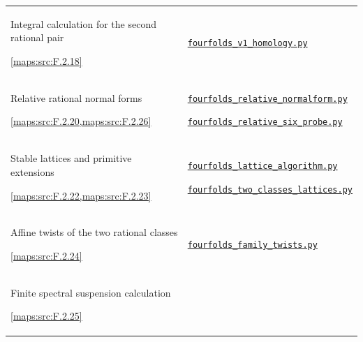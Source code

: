 \begin{longtable}{@{}p{}p{}@{}}
\hypertarget{prog:V:second-pair}{}Integral calculation for the second rational pair\par \cref{maps:src:F.2.18} &
\href{https://github.com/KokunoYumeto/s6-complex-structure-workbench/blob/\SsixRepositoryCommit/pro_returns/S6_10_PAPERS_checkpoint_15_20261119T1045Z/S6_10_PAPERS/code/V/replay_chains/code/fourfolds_v1_homology.py}{\nolinkurl{fourfolds_v1_homology.py}} \\[3pt]
\hypertarget{prog:V:normal-forms}{}Relative rational normal forms\par \cref{maps:src:F.2.20,maps:src:F.2.26} &
\href{https://github.com/KokunoYumeto/s6-complex-structure-workbench/blob/\SsixRepositoryCommit/pro_returns/S6_10_PAPERS_checkpoint_15_20261119T1045Z/S6_10_PAPERS/code/V/replay_chains/code/fourfolds_relative_normalform.py}{\nolinkurl{fourfolds_relative_normalform.py}}\par \href{https://github.com/KokunoYumeto/s6-complex-structure-workbench/blob/\SsixRepositoryCommit/pro_returns/S6_10_PAPERS_checkpoint_15_20261119T1045Z/S6_10_PAPERS/code/V/replay_chains/code/fourfolds_relative_six_probe.py}{\nolinkurl{fourfolds_relative_six_probe.py}} \\[3pt]
\hypertarget{prog:V:lattices}{}Stable lattices and primitive extensions\par \cref{maps:src:F.2.22,maps:src:F.2.23} &
\href{https://github.com/KokunoYumeto/s6-complex-structure-workbench/blob/\SsixRepositoryCommit/pro_returns/S6_10_PAPERS_checkpoint_15_20261119T1045Z/S6_10_PAPERS/code/V/replay_chains/code/fourfolds_lattice_algorithm.py}{\nolinkurl{fourfolds_lattice_algorithm.py}}\par \href{https://github.com/KokunoYumeto/s6-complex-structure-workbench/blob/\SsixRepositoryCommit/pro_returns/S6_10_PAPERS_checkpoint_15_20261119T1045Z/S6_10_PAPERS/code/V/replay_chains/code/fourfolds_two_classes_lattices.py}{\nolinkurl{fourfolds_two_classes_lattices.py}} \\[3pt]
\hypertarget{prog:V:twists}{}Affine twists of the two rational classes\par \cref{maps:src:F.2.24} &
\href{https://github.com/KokunoYumeto/s6-complex-structure-workbench/blob/\SsixRepositoryCommit/pro_returns/S6_10_PAPERS_checkpoint_15_20261119T1045Z/S6_10_PAPERS/code/V/replay_chains/code/fourfolds_family_twists.py}{\nolinkurl{fourfolds_family_twists.py}} \\[3pt]
\hypertarget{prog:V:suspension}{}Finite spectral suspension calculation\par \cref{maps:src:F.2.25} &

\end{longtable}
